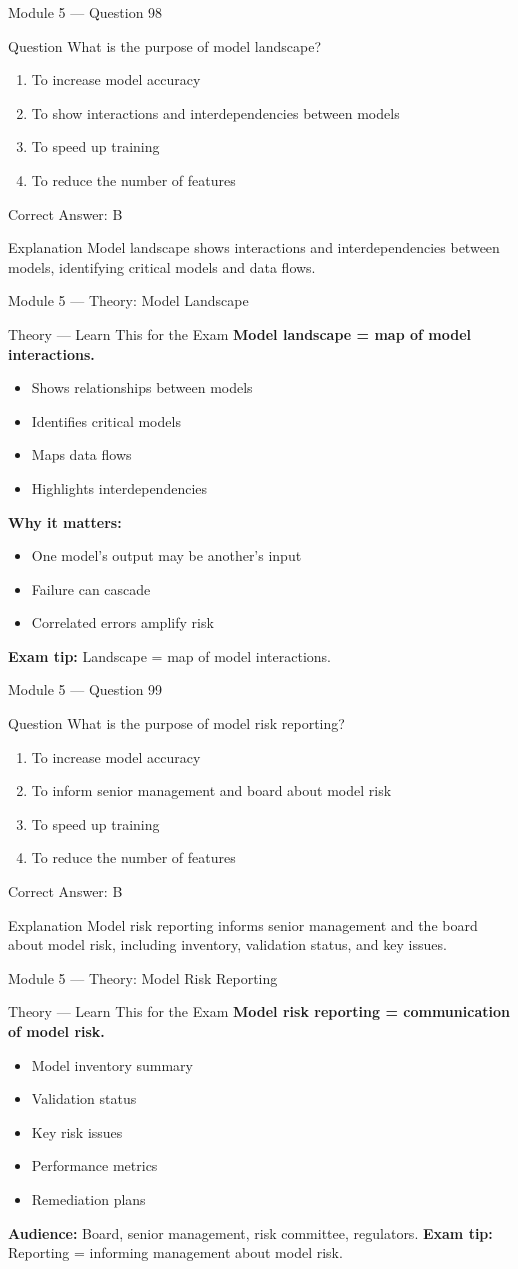 \documentclass[aspectratio=169,10pt]{beamer}
\newcommand{\question}[1]{%
	\begin{block}{Question}
		#1
	\end{block}
}
\newcommand{\options}[4]{%
	\begin{enumerate}[label=\Alph*.,leftmargin=*]
		\item #1
		\item #2
		\item #3
		\item #4
	\end{enumerate}
}
\newcommand{\answerbox}[1]{%
	\begin{exampleblock}{Correct Answer: #1}
	\end{exampleblock}
}
\newcommand{\explain}[1]{%
	\begin{block}{Explanation}
		\small #1
	\end{block}
}
\newcommand{\theory}[1]{%
	\begin{block}{Theory --- Learn This for the Exam}
		\small #1
	\end{block}
}
\begin{document}
	\begin{frame}{Module 5 --- Question 98}
		\question{What is the purpose of model landscape?}
		\options{To increase model accuracy}{To show interactions and interdependencies between models}{To speed up training}{To reduce the number of features}
		\answerbox{B}
		\explain{Model landscape shows interactions and interdependencies between models, identifying critical models and data flows.}
	\end{frame}
	
	\begin{frame}{Module 5 --- Theory: Model Landscape}
		\theory{
			\textbf{Model landscape = map of model interactions.}
			\begin{itemize}
				\item Shows relationships between models
				\item Identifies critical models
				\item Maps data flows
				\item Highlights interdependencies
			\end{itemize}
			\textbf{Why it matters:}
			\begin{itemize}
				\item One model's output may be another's input
				\item Failure can cascade
				\item Correlated errors amplify risk
			\end{itemize}
			\textbf{Exam tip:} Landscape = map of model interactions.
		}
	\end{frame}
	
	\begin{frame}{Module 5 --- Question 99}
		\question{What is the purpose of model risk reporting?}
		\options{To increase model accuracy}{To inform senior management and board about model risk}{To speed up training}{To reduce the number of features}
		\answerbox{B}
		\explain{Model risk reporting informs senior management and the board about model risk, including inventory, validation status, and key issues.}
	\end{frame}
	
	\begin{frame}{Module 5 --- Theory: Model Risk Reporting}
		\theory{
			\textbf{Model risk reporting = communication of model risk.}
			\begin{itemize}
				\item Model inventory summary
				\item Validation status
				\item Key risk issues
				\item Performance metrics
				\item Remediation plans
			\end{itemize}
			\textbf{Audience:} Board, senior management, risk committee, regulators.
			\textbf{Exam tip:} Reporting = informing management about model risk.
		}
	\end{frame}
	
\end{document}
